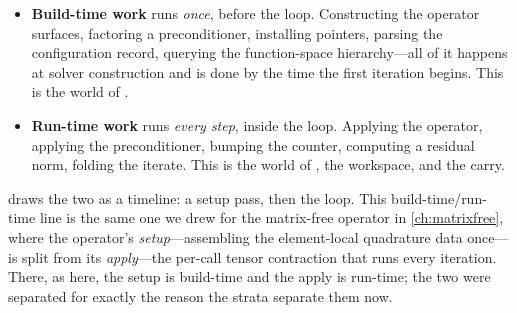 \begin{itemize}[nosep]
  \item \textbf{Build-time work} runs \emph{once}, before the loop. Constructing
  the operator surfaces, factoring a preconditioner, installing pointers, parsing
  the configuration record, querying the function-space hierarchy---all of it
  happens at solver construction and is done by the time the first iteration
  begins. This is the world of .
  \item \textbf{Run-time work} runs \emph{every step}, inside the loop. Applying
  the operator, applying the preconditioner, bumping the counter, computing a
  residual norm, folding the iterate. This is the world of , the
   workspace, and the carry.
\end{itemize}

 draws the two as a timeline: a setup pass, then the loop.
This build-time/run-time line is the same one we drew for the matrix-free
operator in \cref{ch:matrixfree}, where the operator's \emph{setup}---assembling
the element-local quadrature data once---is split from its \emph{apply}---the
per-call tensor contraction that runs every iteration. There, as here, the setup
is build-time and the apply is run-time; the two were separated for exactly the
reason the strata separate them now.

